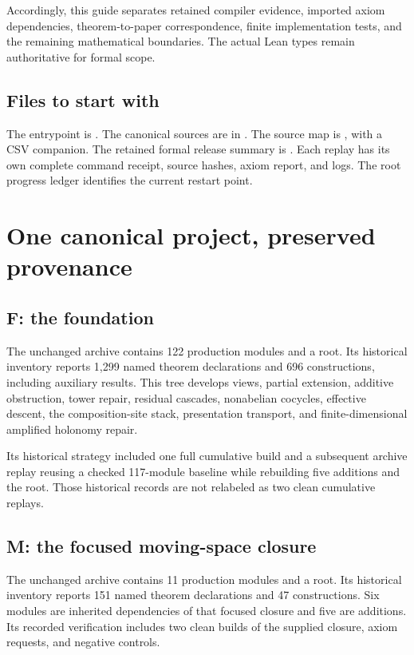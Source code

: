 \documentclass[11pt]{article}
\begin{document}
Accordingly, this guide separates retained compiler evidence, imported axiom dependencies, theorem-to-paper correspondence, finite implementation tests, and the remaining mathematical boundaries. The actual Lean types remain authoritative for formal scope.

\subsection*{Files to start with}
The entrypoint is . The canonical sources are in . The source map is , with a CSV companion. The retained formal release summary is . Each replay has its own complete command receipt, source hashes, axiom report, and logs. The root progress ledger identifies the current restart point.

\clearpage\section{One canonical project, preserved provenance}
\subsection{F: the foundation}
The unchanged archive  contains 122 production modules and a root. Its historical inventory reports 1,299 named theorem declarations and 696 constructions, including auxiliary results. This tree develops views, partial extension, additive obstruction, tower repair, residual cascades, nonabelian cocycles, effective descent, the composition-site stack, presentation transport, and finite-dimensional amplified holonomy repair.

Its historical strategy included one full cumulative build and a subsequent archive replay reusing a checked 117-module baseline while rebuilding five additions and the root. Those historical records are not relabeled as two clean cumulative replays.

\subsection{M: the focused moving-space closure}
The unchanged archive  contains 11 production modules and a root. Its historical inventory reports 151 named theorem declarations and 47 constructions. Six modules are inherited dependencies of that focused closure and five are additions. Its recorded verification includes two clean builds of the supplied closure, axiom requests, and negative controls.
\end{document}

